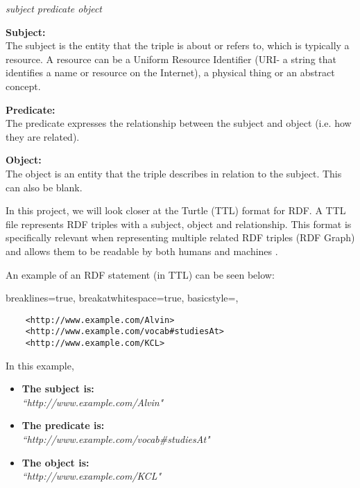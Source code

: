 \vspace{-0.1cm}
\begin{center}
\begin{displayquote}
   \textit{subject predicate object}
\end{displayquote} 
\end{center}
\vspace{-0.2cm}

\textbf{Subject:} \\
The subject is the entity that the triple is about or refers to, which is typically a resource. A resource can be a Uniform Resource Identifier (URI- a string that identifies a name or resource on the Internet), a physical thing or an abstract concept. 

\textbf{Predicate:} \\
The predicate expresses the relationship between the subject and object (i.e. how they are related). 

\textbf{Object:} \\
The object is an entity that the triple describes in relation to the subject. This can also be blank. 

In this project, we will look closer at the Turtle (TTL) format for RDF. A TTL file represents RDF triples with a subject, object and relationship. This format is specifically relevant when representing multiple related RDF triples (RDF Graph) and allows them to be readable by both humans and machines \cite{TTL}.

An example of an RDF statement (in TTL) can be seen below:

\vspace{-0.4cm}
\begin{center}
\lstset
{
    breaklines=true,
    breakatwhitespace=true,
    basicstyle=\linespread{1.5}\ttfamily,
}
\begin{lstlisting}
    <http://www.example.com/Alvin> 
    <http://www.example.com/vocab#studiesAt> 
    <http://www.example.com/KCL>
\end{lstlisting}
\end{center} 
\vspace{-0.3cm}

\noindent In this example, 
\vspace{-0.15cm}
\begin{itemize}
    \itemsep0em 
\item \textbf{The subject is:} \\ \textit{``http://www.example.com/Alvin"}
\item \textbf{The predicate is:} \\ \textit{``http://www.example.com/vocab\#studiesAt"}
\item \textbf{The object is:} \\ \textit{``http://www.example.com/KCL"}
\end{itemize}
\vspace{-0.1cm}

